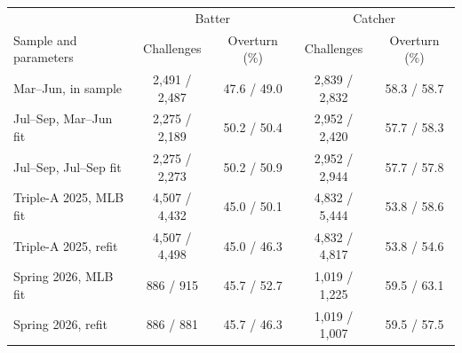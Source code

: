 \begin{tabular}{lcccc}
\toprule
& \multicolumn{2}{c}{Batter} & \multicolumn{2}{c}{Catcher} \\
Sample and parameters & Challenges & Overturn (\%) & Challenges & Overturn (\%) \\
\midrule
Mar--Jun, in sample & 2{,}491 / 2{,}487 & 47.6 / 49.0 & 2{,}839 / 2{,}832 & 58.3 / 58.7 \\
Jul--Sep, Mar--Jun fit & 2{,}275 / 2{,}189 & 50.2 / 50.4 & 2{,}952 / 2{,}420 & 57.7 / 58.3 \\
Jul--Sep, Jul--Sep fit & 2{,}275 / 2{,}273 & 50.2 / 50.9 & 2{,}952 / 2{,}944 & 57.7 / 57.8 \\
Triple-A 2025, MLB fit & 4{,}507 / 4{,}432 & 45.0 / 50.1 & 4{,}832 / 5{,}444 & 53.8 / 58.6 \\
Triple-A 2025, refit & 4{,}507 / 4{,}498 & 45.0 / 46.3 & 4{,}832 / 4{,}817 & 53.8 / 54.6 \\
Spring 2026, MLB fit & 886 / 915 & 45.7 / 52.7 & 1{,}019 / 1{,}225 & 59.5 / 63.1 \\
Spring 2026, refit & 886 / 881 & 45.7 / 46.3 & 1{,}019 / 1{,}007 & 59.5 / 57.5 \\
\bottomrule
\end{tabular}
